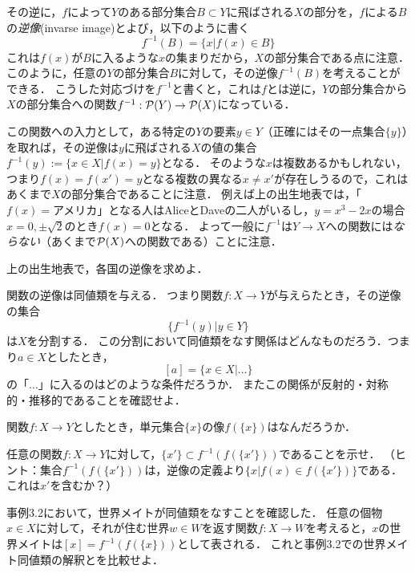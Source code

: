 \documentclass[11pt,a4paper]{jsarticle} %
\begin{document}
その逆に，$f$によって$Y$のある部分集合$B \subset Y$に飛ばされる$X$の部分を，$f$による$B$の\emph{逆像}(invarse image)とよび，以下のように書く
\[
 f^{-1}(B) = \{x|f(x) \in B\} 
\]
これは$f(x)$が$B$に入るような$x$の集まりだから，$X$の部分集合である点に注意．
このように，任意の$Y$の部分集合$B$に対して，その逆像$f^{-1}(B)$を考えることができる．
こうした対応づけを$f^{-1}$と書くと，これは$f$とは逆に，$Y$の部分集合から$X$の部分集合への関数$f^{-1}:\mathcal{P}(Y) \to \mathcal{P}(X)$になっている．

この関数への入力として，ある特定の$Y$の要素$y \in Y$（正確にはその一点集合$\{y\}$）を取れば，その逆像は$y$に飛ばされる$X$の値の集合$f^{-1}(y) := \{ x \in X | f(x) = y\}$となる．
そのような$x$は複数あるかもしれない，つまり$f(x) = f(x') = y$となる複数の異なる$x \neq x'$が存在しうるので，これはあくまで$X$の部分集合であることに注意．
例えば上の出生地表では，「$f(x)=\text{アメリカ}$」となる人はAliceとDaveの二人がいるし，$y=x^3-2x$の場合$x=0, \pm \sqrt{2}$のとき$f(x)=0$となる．
よって一般に$f^{-1}$は$Y \to X$への関数には\emph{ならない}（あくまで$\mathcal{P}(X)$への関数である）ことに注意．

\begin{exercise}
 上の出生地表で，各国の逆像を求めよ．
\end{exercise}

\begin{exercise}
関数の逆像は同値類を与える．
つまり関数$f:X \to Y$が与えらたとき，その逆像の集合
\[
 \{f^{-1}(y) | y \in Y\}
\]
は$X$を分割する．
この分割において同値類をなす関係はどんなものだろう．つまり$a \in X$としたとき，
\[
 [a] = \{x \in X |\dots \}
\]
の「$\dots$」に入るのはどのような条件だろうか．
またこの関係が反射的・対称的・推移的であることを確認せよ．
\end{exercise}


\begin{exercise}
関数$f:X \to Y$としたとき，単元集合$\{x\}$の像$f(\{x\})$はなんだろうか．
\end{exercise}



\begin{exercise}
 任意の関数$f:X \to Y$に対して，$\{x'\} \subset f^{-1}(f(\{x'\}))$であることを示せ．
（ヒント：集合$f^{-1}(f(\{x'\}))$は，逆像の定義より$\{ x | f(x) \in f(\{x'\}) \}$である．これは$x'$を含むか？）
\end{exercise}


\begin{example}
 事例3.2において，世界メイトが同値類をなすことを確認した．
 任意の個物$x \in X$に対して，それが住む世界$w \in W$を返す関数$f:X \to W$を考えると，$x$の世界メイトは$[x] = f^{-1}(f(\{x\}))$として表される．
 これと事例3.2での世界メイト同値類の解釈とを比較せよ．
\end{example}
\end{document}
